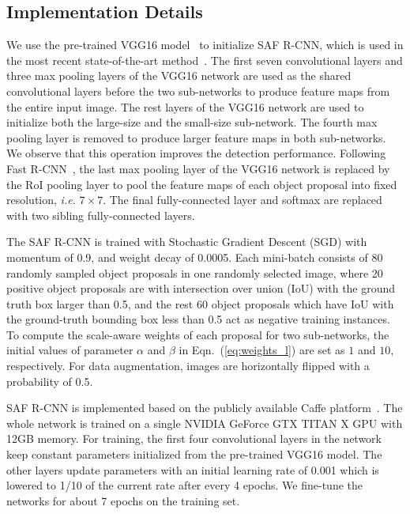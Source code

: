 \documentclass[journal]{IEEEtran}
\begin{document}
\subsection{Implementation Details}
We use the pre-trained VGG16 model~\cite{simonyan2014very} to initialize SAF R-CNN, which is used in the most recent state-of-the-art method~\cite{compact}. The first seven convolutional layers and three max pooling layers of the VGG16 network are used as the shared convolutional layers before the two sub-networks to produce feature maps from the entire input image. The rest layers of the VGG16 network are used to initialize both the large-size and the small-size sub-network. The fourth max pooling layer is removed to produce larger feature maps in both sub-networks. We observe that this operation improves the  detection performance. Following Fast R-CNN~\cite{girshick2015fast}, the last max pooling layer of the VGG16 network is replaced by the RoI pooling layer to pool the feature maps of each object proposal into fixed resolution, \emph{i.e.} $7\times7$. The final fully-connected layer and softmax are replaced with two sibling fully-connected layers.

The SAF R-CNN is trained with Stochastic Gradient Descent (SGD) with momentum of 0.9, and weight decay of 0.0005. Each mini-batch consists of 80 randomly sampled object proposals in one randomly selected image, where 20 positive object proposals are with intersection over union (IoU) with the ground truth box larger than 0.5, and the rest 60 object proposals which have IoU with the ground-truth bounding box less than 0.5 act as negative training instances. To compute the scale-aware weights of each proposal for two sub-networks, the initial values of parameter $\alpha$ and $\beta$ in Eqn.~(\ref{eq:weights_l}) are set as $1$ and $10$, respectively.
For data augmentation, images are horizontally flipped with a probability of 0.5.

SAF R-CNN is implemented based on the publicly available Caffe platform~\cite{jia2014caffe}. The whole network is trained on a single NVIDIA GeForce GTX TITAN X GPU with 12GB memory. For training, the first four convolutional layers in the network keep constant parameters initialized from the pre-trained VGG16 model. The other layers update parameters with an initial learning rate of 0.001 which is lowered to 1/10 of the current rate after every 4 epochs. We fine-tune the networks for about 7 epochs on the training set. %
\end{document}
